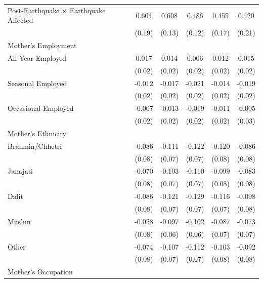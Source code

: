 \begin{longtable}{l*{5}{c}}
Post-Earthquake × Earthquake Affected & 0.604\sym{***} & 0.608\sym{***} & 0.486\sym{***} & 0.455\sym{***} & 0.420\sym{**} \\
                    & (0.19) & (0.13) & (0.12) & (0.17) & (0.21) \\
\multicolumn{6}{l}{Mother's Employment} \\
\hspace{1em}All Year Employed & 0.017 & 0.014 & 0.006 & 0.012 & 0.015 \\
                    & (0.02) & (0.02) & (0.02) & (0.02) & (0.02) \\
\hspace{1em}Seasonal Employed & -0.012 & -0.017 & -0.021 & -0.014 & -0.019 \\
                    & (0.02) & (0.02) & (0.02) & (0.02) & (0.02) \\
\hspace{1em}Occasional Employed & -0.007 & -0.013 & -0.019 & -0.011 & -0.005 \\
                    & (0.02) & (0.02) & (0.02) & (0.02) & (0.03) \\
\multicolumn{6}{l}{Mother's Ethnicity} \\
\hspace{1em}Brahmin/Chhetri & -0.086 & -0.111 & -0.122\sym{*} & -0.120 & -0.086 \\
                    & (0.08) & (0.07) & (0.07) & (0.08) & (0.08) \\
\hspace{1em}Janajati & -0.070 & -0.103 & -0.110 & -0.099 & -0.083 \\
                    & (0.08) & (0.07) & (0.07) & (0.08) & (0.08) \\
\hspace{1em}Dalit & -0.086 & -0.121\sym{*} & -0.129\sym{*} & -0.116 & -0.098 \\
                    & (0.08) & (0.07) & (0.07) & (0.07) & (0.08) \\
\hspace{1em}Muslim & -0.058 & -0.097 & -0.102 & -0.087 & -0.073 \\
                    & (0.08) & (0.06) & (0.06) & (0.07) & (0.07) \\
\hspace{1em}Other & -0.074 & -0.107 & -0.112\sym{*} & -0.103 & -0.092 \\
                    & (0.08) & (0.07) & (0.07) & (0.08) & (0.08) \\
\multicolumn{6}{l}{Mother's Occupation} \\

\end{longtable}
